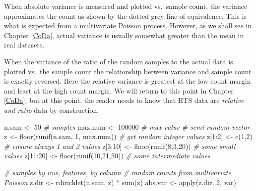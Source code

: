 \documentclass[
  onecolumn]{article}
\newenvironment{Shaded}{\begin{snugshade}}{\end{snugshade}}
\newcommand{\CommentTok}[1]{\textcolor[rgb]{0.56,0.35,0.01}{\textit{#1}}}
\newcommand{\DecValTok}[1]{\textcolor[rgb]{0.00,0.00,0.81}{#1}}
\newcommand{\FunctionTok}[1]{\textcolor[rgb]{0.00,0.00,0.00}{#1}}
\newcommand{\NormalTok}[1]{#1}
\newcommand{\OtherTok}[1]{\textcolor[rgb]{0.56,0.35,0.01}{#1}}
\newcommand{\SpecialCharTok}[1]{\textcolor[rgb]{0.00,0.00,0.00}{#1}}
\begin{document}
When absolute variance is measured and plotted vs.~sample count, the variance approximates the count as shown by the dotted grey line of equivalence. This is what is expected from a multivariate Poisson process. However, as we shall see in Chapter \ref{CoDa}, actual variance is usually somewhat greater than the mean in real datasets.

When the variance of the ratio of the random samples to the actual data is plotted vs.~the sample count the relationship between variance and sample count is exactly reversed. Here the relative variance is greatest at the low count margin and least at the high count margin. We will return to this point in Chapter \ref{CoDa}, but at this point, the reader needs to know that HTS data are \emph{relative and ratio} data by construction.

\begin{Shaded}
\begin{Highlighting}[]
\NormalTok{n.sam }\OtherTok{\textless{}{-}} \DecValTok{50} \CommentTok{\# samples}
\NormalTok{max.num }\OtherTok{\textless{}{-}} \DecValTok{100000} \CommentTok{\# max value}
\CommentTok{\# semi{-}random vector}
\NormalTok{z }\OtherTok{\textless{}{-}} \FunctionTok{floor}\NormalTok{(}\FunctionTok{runif}\NormalTok{(n.sam, }\DecValTok{1}\NormalTok{, max.num)) }\CommentTok{\# get random integer values}
\NormalTok{z[}\DecValTok{1}\SpecialCharTok{:}\DecValTok{2}\NormalTok{] }\OtherTok{\textless{}{-}} \FunctionTok{c}\NormalTok{(}\DecValTok{1}\NormalTok{,}\DecValTok{2}\NormalTok{) }\CommentTok{\# ensure always 1 and 2 values}
\NormalTok{z[}\DecValTok{3}\SpecialCharTok{:}\DecValTok{10}\NormalTok{] }\OtherTok{\textless{}{-}} \FunctionTok{floor}\NormalTok{(}\FunctionTok{runif}\NormalTok{(}\DecValTok{8}\NormalTok{,}\DecValTok{3}\NormalTok{,}\DecValTok{20}\NormalTok{)) }\CommentTok{\# some small values}
\NormalTok{z[}\DecValTok{11}\SpecialCharTok{:}\DecValTok{20}\NormalTok{] }\OtherTok{\textless{}{-}} \FunctionTok{floor}\NormalTok{(}\FunctionTok{runif}\NormalTok{(}\DecValTok{10}\NormalTok{,}\DecValTok{21}\NormalTok{,}\DecValTok{50}\NormalTok{)) }\CommentTok{\# some intermediate values}

\CommentTok{\# samples by row, features, by column}
\CommentTok{\# random counts from multivariate Poisson}
\NormalTok{z.dir }\OtherTok{\textless{}{-}} \FunctionTok{rdirichlet}\NormalTok{(n.sam, z) }\SpecialCharTok{*} \FunctionTok{sum}\NormalTok{(z)}
\NormalTok{abs.var }\OtherTok{\textless{}{-}} \FunctionTok{apply}\NormalTok{(z.dir, }\DecValTok{2}\NormalTok{, var)}


\end{Highlighting}
\end{Shaded}
\end{document}
